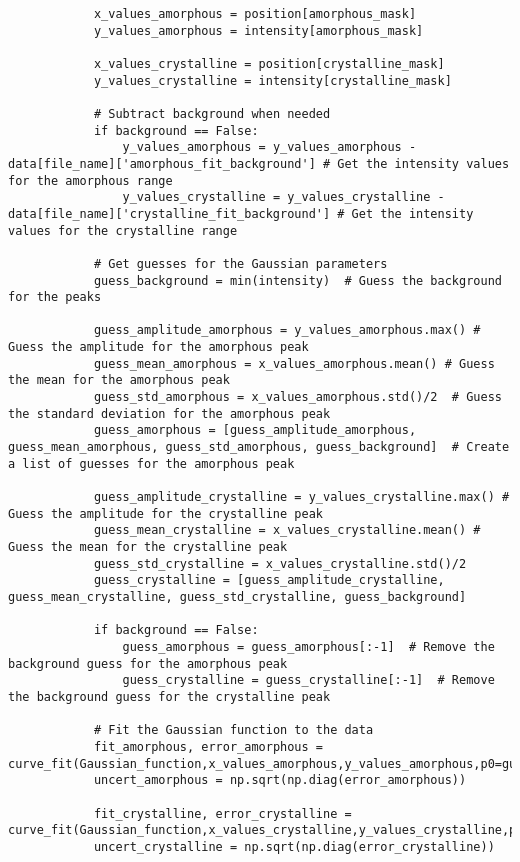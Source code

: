 \begin{small}
\begin{verbatim}
            x_values_amorphous = position[amorphous_mask]
            y_values_amorphous = intensity[amorphous_mask]

            x_values_crystalline = position[crystalline_mask]
            y_values_crystalline = intensity[crystalline_mask]

            # Subtract background when needed
            if background == False:
                y_values_amorphous = y_values_amorphous - data[file_name]['amorphous_fit_background'] # Get the intensity values for the amorphous range
                y_values_crystalline = y_values_crystalline - data[file_name]['crystalline_fit_background'] # Get the intensity values for the crystalline range
            
            # Get guesses for the Gaussian parameters
            guess_background = min(intensity)  # Guess the background for the peaks
            
            guess_amplitude_amorphous = y_values_amorphous.max() # Guess the amplitude for the amorphous peak
            guess_mean_amorphous = x_values_amorphous.mean() # Guess the mean for the amorphous peak
            guess_std_amorphous = x_values_amorphous.std()/2  # Guess the standard deviation for the amorphous peak
            guess_amorphous = [guess_amplitude_amorphous, guess_mean_amorphous, guess_std_amorphous, guess_background]  # Create a list of guesses for the amorphous peak

            guess_amplitude_crystalline = y_values_crystalline.max() # Guess the amplitude for the crystalline peak
            guess_mean_crystalline = x_values_crystalline.mean() # Guess the mean for the crystalline peak
            guess_std_crystalline = x_values_crystalline.std()/2
            guess_crystalline = [guess_amplitude_crystalline, guess_mean_crystalline, guess_std_crystalline, guess_background]

            if background == False:
                guess_amorphous = guess_amorphous[:-1]  # Remove the background guess for the amorphous peak
                guess_crystalline = guess_crystalline[:-1]  # Remove the background guess for the crystalline peak

            # Fit the Gaussian function to the data
            fit_amorphous, error_amorphous = curve_fit(Gaussian_function,x_values_amorphous,y_values_amorphous,p0=guess_amorphous)
            uncert_amorphous = np.sqrt(np.diag(error_amorphous))

            fit_crystalline, error_crystalline = curve_fit(Gaussian_function,x_values_crystalline,y_values_crystalline,p0=guess_crystalline)
            uncert_crystalline = np.sqrt(np.diag(error_crystalline))


\end{verbatim}
\end{small}
